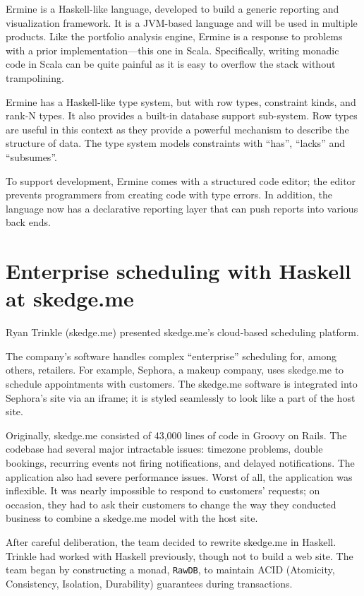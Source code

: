 \documentclass{jfp1}
\begin{document}
Ermine is a Haskell-like language, developed to build a generic reporting
and visualization framework. It is a JVM-based language and will be
used in multiple products.  Like the portfolio analysis engine, Ermine is a
response to problems with a prior implementation---this one in Scala.
Specifically, writing monadic code in Scala can be quite painful as it is
easy to overflow the stack without trampolining.

Ermine has a Haskell-like type system, but with row types, constraint
kinds, and rank-N types. It also provides a built-in database support
sub-system.  Row types are useful in this context as they provide a
powerful mechanism to describe the structure of data. The type system
models constraints with ``has'', ``lacks'' and ``subsumes''.

To support development, Ermine comes with a structured code editor; the
editor prevents programmers from creating code with type errors. In
addition, the language now has a declarative reporting layer that can push
reports into various back ends.

\section{Enterprise scheduling with Haskell at skedge.me}


Ryan Trinkle (skedge.me) presented skedge.me's cloud-based scheduling
platform.

The company's software handles complex ``enterprise'' scheduling for, among
others, retailers. For example, Sephora, a makeup company, uses skedge.me
to schedule appointments with customers. The skedge.me software is
integrated into Sephora's site via an iframe; it is styled seamlessly to
look like a part of the host site.

Originally, skedge.me consisted of 43,000 lines of code in Groovy on Rails.
The codebase had several major intractable issues: timezone problems,
double bookings, recurring events not firing notifications, and delayed
notifications. The application also had severe performance issues.  Worst
of all, the application was inflexible. It was nearly impossible to respond
to customers' requests; on occasion, they had to ask their customers to
change the way they conducted business to combine a skedge.me model with
the host site. 

After careful deliberation, the team decided to rewrite skedge.me in
Haskell. Trinkle had worked with Haskell previously, though not to
build a web site. The team began by constructing a monad,
\texttt{RawDB}, to maintain ACID (Atomicity, Consistency, Isolation,
Durability) guarantees during transactions.
\end{document}

